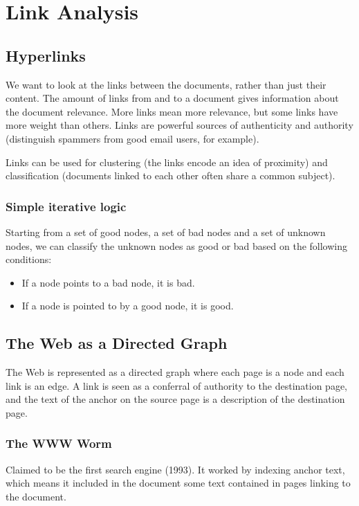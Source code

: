 \section{Link Analysis}

\subsection{Hyperlinks}

We want to look at the links between the documents, rather than just their content.
The amount of links from and to a document gives information about the document relevance. More links mean more relevance, but some links have more weight than others.
Links are powerful sources of authenticity and authority (distinguish spammers from good email users, for example).

Links can be used for clustering (the links encode an idea of proximity) and classification (documents linked to each other often share a common subject).

\subsubsection{Simple iterative logic}

Starting from a set of good nodes, a set of bad nodes and a set of unknown nodes, we can classify the unknown nodes as good or bad based on the following conditions:
\begin{itemize}
\item If a node points to a bad node, it is bad.
\item If a node is pointed to by a good node, it is good.
\end{itemize}

\subsection{The Web as a Directed Graph}

The Web is represented as a directed graph where each page is a node and each link is an edge. A link is seen as a conferral of authority to the destination page, and the text of the anchor on the source page is a description of the destination page.

\subsubsection{The WWW Worm}

Claimed to be the first search engine (1993). It worked by indexing anchor text, which means it included in the document some text contained in pages linking to the document.

